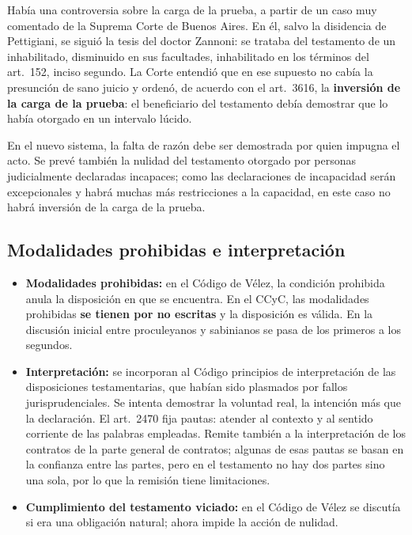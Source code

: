 \documentclass[12pt,oneside]{book}
\begin{document}
Había una controversia sobre la carga de la prueba, a partir de un caso muy comentado de la Suprema Corte de Buenos Aires. En él, salvo la disidencia de Pettigiani, se siguió la tesis del doctor Zannoni: se trataba del testamento de un inhabilitado, disminuido en sus facultades, inhabilitado en los términos del art.~152, inciso segundo. La Corte entendió que en ese supuesto no cabía la presunción de sano juicio y ordenó, de acuerdo con el art.~3616, la \textbf{inversión de la carga de la prueba}: el beneficiario del testamento debía demostrar que lo había otorgado en un intervalo lúcido.

En el nuevo sistema, la falta de razón debe ser demostrada por quien impugna el acto. Se prevé también la nulidad del testamento otorgado por personas judicialmente declaradas incapaces; como las declaraciones de incapacidad serán excepcionales y habrá muchas más restricciones a la capacidad, en este caso no habrá inversión de la carga de la prueba.

\subsection{Modalidades prohibidas e interpretación}

\begin{itemize}
    \item \textbf{Modalidades prohibidas:} en el Código de Vélez, la condición prohibida anula la disposición en que se encuentra. En el CCyC, las modalidades prohibidas \textbf{se tienen por no escritas} y la disposición es válida. En la discusión inicial entre proculeyanos y sabinianos se pasa de los primeros a los segundos.
    \item \textbf{Interpretación:} se incorporan al Código principios de interpretación de las disposiciones testamentarias, que habían sido plasmados por fallos jurisprudenciales. Se intenta demostrar la voluntad real, la intención más que la declaración. El art.~2470 fija pautas: atender al contexto y al sentido corriente de las palabras empleadas. Remite también a la interpretación de los contratos de la parte general de contratos; algunas de esas pautas se basan en la confianza entre las partes, pero en el testamento no hay dos partes sino una sola, por lo que la remisión tiene limitaciones.
    \item \textbf{Cumplimiento del testamento viciado:} en el Código de Vélez se discutía si era una obligación natural; ahora impide la acción de nulidad.
\end{itemize}
\end{document}
